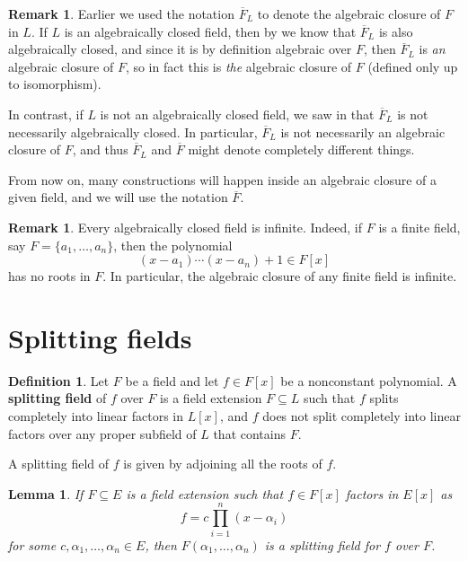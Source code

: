 \documentclass[12pt]{report}
\newtheorem{lemma}[theorem]{Lemma}
\numberwithin{equation}{section}
\numberwithin{theorem}{chapter}
\theoremstyle{definition}
\newtheorem{definition}[theorem]{Definition}
\newtheorem*{basic properties}{Basic Properties}
\newtheorem*{Important Remark}{Important Remark}
\newtheorem{remark}[theorem]{Remark}
\newcommand{\df}[1]{{\bf #1}\index{#1}}
\begin{document}
\begin{remark}
	Earlier we used the notation $\overline{F}_L$ to denote the algebraic closure of $F$ in $L$. If $L$ is an algebraically closed field, then by  we know that $\overline{F}_L$ is also algebraically closed, and since it is by definition algebraic over $F$, then $\overline{F}_L$ is \emph{an} algebraic closure of $F$, so in fact this is \emph{the} algebraic closure of $F$ (defined only up to isomorphism).
	
	In contrast, if $L$ is not an algebraically closed field, we saw in  that $\overline{F}_L$ is not necessarily algebraically closed. In particular, $\overline{F}_L$ is not necessarily an algebraic closure of $F$, and thus $\overline{F}_L$ and $\overline{F}$ might denote completely different things.
\end{remark}

From now on, many constructions will happen inside an algebraic closure of a given field, and we will use the notation $\overline{F}$.

\begin{remark}
	Every algebraically closed field is infinite. Indeed, if $F$ is a finite field, say $F = \{ a_1, \ldots, a_n \}$, then the polynomial
	$$(x-a_1) \cdots (x-a_n) + 1 \in F[x]$$
has no roots in $F$. In particular, the algebraic closure of any finite field is infinite.
\end{remark}

\section{Splitting fields}

\begin{definition} 
Let $F$ be a field and let $f \in F[x]$ be a nonconstant polynomial. A \df{splitting field} of $f$ over $F$ is a field extension $F \subseteq L$ such that $f$ splits completely into linear factors in $L[x]$, and $f$ does not split completely into linear factors over any proper subfield of $L$ that contains $F$.
\end{definition}


A splitting field of $f$ is given by adjoining all the roots of $f$.

\begin{lemma}\label{lemma splitting field}
If $F \subseteq E$ is a field extension such that $f \in F[x]$ factors in $E[x]$ as 
$$f = c\prod_{i=1}^n (x - \alpha_i)$$ 
for some $c,\alpha_1, \ldots, \alpha_n \in E$, then $F(\alpha_1,\ldots,\alpha_n)$ is a splitting field for $f$ over $F$. 
\end{lemma}
\end{document}
